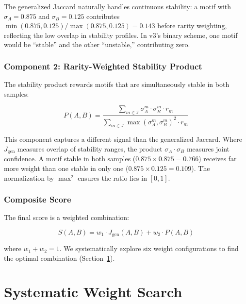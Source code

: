 \documentclass{../yalumba}
\begin{document}

The generalized Jaccard naturally handles continuous stability: a motif with
$\sigma_A = 0.875$ and $\sigma_B = 0.125$ contributes
$\min(0.875, 0.125) / \max(0.875, 0.125) = 0.143$ before rarity weighting,
reflecting the low overlap in stability profiles.  In v3's binary scheme, one
motif would be ``stable'' and the other ``unstable,'' contributing zero.

\subsubsection{Component 2: Rarity-Weighted Stability Product}

The stability product rewards motifs that are simultaneously stable in both
samples:

\begin{equation}
  P(A, B) =
  \frac{\displaystyle\sum_{m \in \mathcal{I}} \sigma_A^m \cdot \sigma_B^m \cdot r_m}
       {\displaystyle\sum_{m \in \mathcal{I}} \max(\sigma_A^m, \sigma_B^m)^2 \cdot r_m}
  \label{eq:prod-ratio}
\end{equation}

This component captures a different signal than the generalized Jaccard.
Where $J_{\text{gen}}$ measures overlap of stability ranges, the product
$\sigma_A \cdot \sigma_B$ measures joint confidence.  A motif stable in both
samples ($0.875 \times 0.875 = 0.766$) receives far more weight than one
stable in only one ($0.875 \times 0.125 = 0.109$).  The normalization by
$\max^2$ ensures the ratio lies in $[0, 1]$.

\subsubsection{Composite Score}

The final score is a weighted combination:

\begin{equation}
  S(A, B) = w_1 \cdot J_{\text{gen}}(A, B) + w_2 \cdot P(A, B)
  \label{eq:composite}
\end{equation}

where $w_1 + w_2 = 1$.  We systematically explore six weight configurations
to find the optimal combination (Section~\ref{sec:weight-search}).


\section{Systematic Weight Search}
\label{sec:weight-search}
\end{document}
